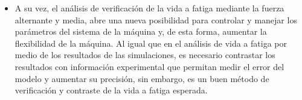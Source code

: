 \begin{itemize}
	\item A su vez, el análisis de verificación de la vida a fatiga mediante la fuerza alternante y media, abre una nueva posibilidad para controlar y manejar los parámetros del sistema de la máquina y, de esta forma, aumentar la flexibilidad de la máquina. Al igual que en el análisis de vida a fatiga por medio de los resultados de las simulaciones, es necesario contrastar los resultados con información experimental que permitan medir el error del modelo y aumentar su precisión, sin embargo, es un buen método de verificación y contraste de la vida a fatiga esperada.
\end{itemize}

%

\newpage

